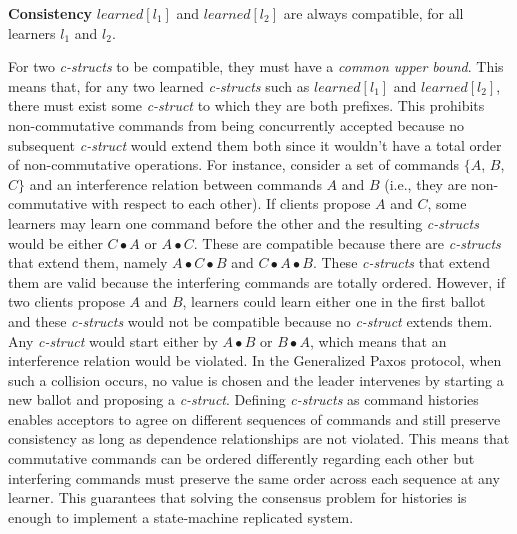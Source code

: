 \documentclass[runningheads,a4paper]{llncs}
\begin{document}
\textbf{Consistency} $learned[l_1]$ and $learned[l_2]$ are always compatible, for all learners $l_1$ and $l_2$. \par
For two \textit{c-structs} to be compatible, they must have a \textit{common upper bound}. This means that, for any two learned \textit{c-structs} such as $learned[l_1]$ and $learned[l_2]$, there must exist some \textit{c-struct} to which they are both prefixes. This prohibits non-commutative commands from being concurrently accepted because no subsequent \textit{c-struct} would extend them both since it wouldn't have a total order of non-commutative operations. For instance, consider a set of commands $\lbrace A$, $B$, $C\rbrace$ and an interference relation between commands $A$ and $B$ (i.e., they are non-commutative with respect to each other). If clients propose $A$ and $C$, some learners may learn one command before the other and the resulting \textit{c-structs} would be either $C \bullet A$ or $A \bullet C$. These are compatible because there are \textit{c-structs} that extend them, namely $A \bullet C \bullet B$ and $C \bullet A \bullet B$. These \textit{c-structs} that extend them are valid because the interfering commands are totally ordered. However, if two clients propose $A$ and $B$, learners could learn either one in the first ballot and these \textit{c-structs} would not be compatible because no \textit{c-struct} extends them. Any \textit{c-struct} would start either by $A \bullet B$ or $B \bullet A$, which means that an interference relation would be violated. In the Generalized Paxos protocol, when such a collision occurs, no value is chosen and the leader intervenes by starting a new ballot and proposing a \textit{c-struct}. Defining \textit{c-structs} as command histories enables acceptors to agree on different sequences of commands and still preserve consistency as long as dependence relationships are not violated. This means that commutative commands can be ordered differently regarding each other but interfering commands must preserve the same order across each sequence at any learner. This guarantees that solving the consensus problem for histories is enough to implement a state-machine replicated system. \par
\end{document}
